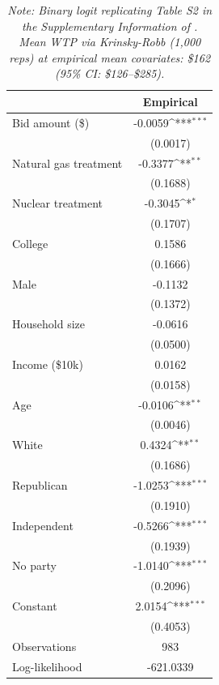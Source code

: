 {
\begin{table}[]
\centering
\caption{Replication of Study 1}
\def\sym#1{\ifmmode^{#1}\else\(^{#1}\)\fi}
\begin{tabular}{l*{1}{c}}
\toprule
                    &\multicolumn{1}{c}{Empirical}\\
\midrule
Bid amount (\$)      &     -0.0059\sym{***}\\
                    &    (0.0017)         \\
\addlinespace
Natural gas treatment&     -0.3377\sym{**} \\
                    &    (0.1688)         \\
\addlinespace
Nuclear treatment   &     -0.3045\sym{*}  \\
                    &    (0.1707)         \\
\addlinespace
College             &      0.1586         \\
                    &    (0.1666)         \\
\addlinespace
Male                &     -0.1132         \\
                    &    (0.1372)         \\
\addlinespace
Household size      &     -0.0616         \\
                    &    (0.0500)         \\
\addlinespace
Income (\$10k)       &      0.0162         \\
                    &    (0.0158)         \\
\addlinespace
Age                 &     -0.0106\sym{**} \\
                    &    (0.0046)         \\
\addlinespace
White               &      0.4324\sym{**} \\
                    &    (0.1686)         \\
\addlinespace
Republican          &     -1.0253\sym{***}\\
                    &    (0.1910)         \\
\addlinespace
Independent         &     -0.5266\sym{***}\\
                    &    (0.1939)         \\
\addlinespace
No party            &     -1.0140\sym{***}\\
                    &    (0.2096)         \\
\addlinespace
Constant            &      2.0154\sym{***}\\
                    &    (0.4053)         \\
\midrule
Observations        &         983         \\
Log-likelihood      &   -621.0339         \\
\bottomrule
\end{tabular}
\caption*{\footnotesize \textit{Note: Binary logit replicating Table S2 in the Supplementary Information of \textcite{Aldy2012}.\\
Mean WTP via Krinsky-Robb (1{,}000 reps) at empirical mean covariates: \$162 (95\% CI: \$126--\$285).}}
\end{table}
}
